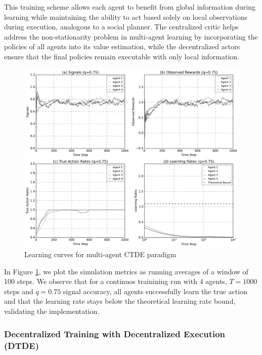 This training scheme allows each agent to benefit from global information during learning while maintaining the ability to act based solely on local observations during execution, analogous to a social planner. The centralized critic helps address the non-stationarity problem in multi-agent learning by incorporating the policies of all agents into its value estimation, while the decentralized actors ensure that the final policies remain executable with only local information.

\begin{figure}[htbp]
    \centering
    \includegraphics[width=1\textwidth]{../charts/multi_agent_ctde_learning_curves_q=0.75.png}
    \caption{Learning curves for multi-agent CTDE paradigm} 
    \label{fig:multi-learning-curves-ctde}
\end{figure}

In Figure \ref{fig:multi-learning-curves-ctde}, we plot the simulation metrics as running averages of a window of 100 steps. We  observe that for a continuos trainining run with 4 agents, $T= 1000$ steps and $q=0.75$ signal accuracy, all agents successfully learn the true action and that the learning rate stays below the theoretical learning rate bound, validating the implementation.

\subsubsection*{Decentralized Training with Decentralized Execution (DTDE)}

